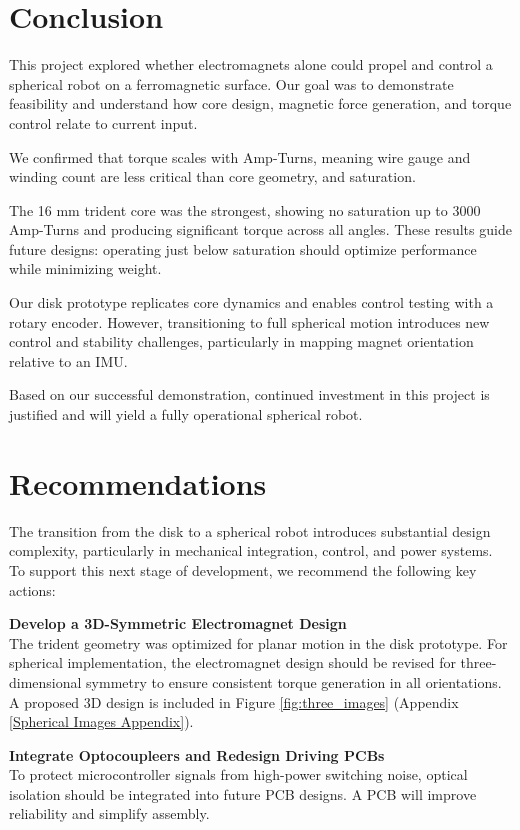 \documentclass[11pt]{article} %
\begin{document}
\section{Conclusion}
This project explored whether electromagnets alone could propel and control a spherical robot on a ferromagnetic surface. Our goal was to demonstrate feasibility and understand how core design, magnetic force generation, and torque control relate to current input.

We confirmed that torque scales with Amp-Turns, meaning wire gauge and winding count are less critical than core geometry, and saturation.

The 16 mm trident core was the strongest, showing no saturation up to 3000 Amp-Turns and producing significant torque across all angles. These results guide future designs: operating just below saturation should optimize performance while minimizing weight.

Our disk prototype replicates core dynamics and enables control testing with a rotary encoder. However, transitioning to full spherical motion introduces new control and stability challenges, particularly in mapping magnet orientation relative to an IMU.

Based on our successful demonstration, continued investment in this project is justified and will yield a fully operational spherical robot.

\section{Recommendations}
The transition from the disk to a spherical robot introduces substantial design complexity, particularly in mechanical integration, control, and power systems. To support this next stage of development, we recommend the following key actions:

\textbf{Develop a 3D-Symmetric Electromagnet Design}\\
The trident geometry was optimized for planar motion in the disk prototype. For spherical implementation, the electromagnet design should be revised for three-dimensional symmetry to ensure consistent torque generation in all orientations. A proposed 3D design is included in Figure \ref{fig:three_images} (Appendix \ref{Spherical Images Appendix}).

\textbf{Integrate Optocoupleers and Redesign Driving PCBs}\\
To protect microcontroller signals from high-power switching noise, optical isolation should be integrated into future PCB designs. A PCB will improve reliability and simplify assembly.
\end{document}

